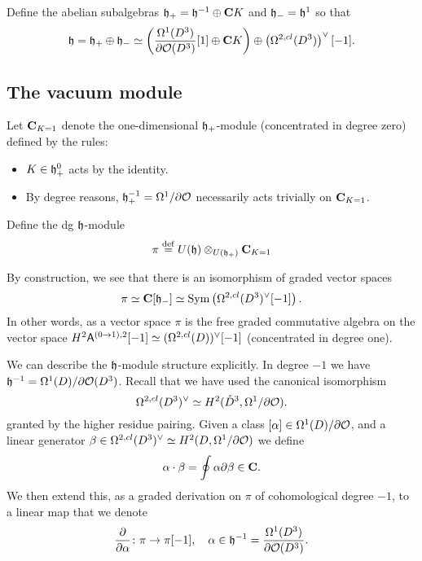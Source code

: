 \documentclass[11pt]{amsart}
\renewcommand{\op}{\operatorname}
\begin{document}
Define the abelian subalgebras $\mathfrak{h}_{+} = \mathfrak{h}^{-1} \oplus \mathbf{C} K$ and $\mathfrak{h}_{-} = \mathfrak{h}^{1}$ so that
\begin{equation}\label{}
  \mathfrak{h} = \mathfrak{h}_{+} \oplus \mathfrak{h}_{-} \simeq \left(\frac{\Omega^{1}(D^{3})}{\partial \mathcal O(D^{3})} [1] \oplus \mathbf{C} K\right) \oplus \left(\Omega^{2,cl}(D^{3})\right)^{\vee} [-1] .
\end{equation}


\subsection{The vacuum module}

Let $\mathbf{C}_{K=1}$ denote the one-dimensional $\mathfrak{h}_{+}$-module (concentrated in degree zero) defined by the rules:
\begin{itemize}
  \item $K \in \mathfrak{h}_{+}^{0}$ acts by the identity.
  \item By degree reasons, $\mathfrak{h}_{+}^{-1} = \Omega^{1} \slash \partial \mathcal O$ necessarily acts trivially on $\mathbf{C}_{K = 1}$.
\end{itemize}

Define the dg $\mathfrak{h}$-module
\begin{equation}\label{eqn:module}
  \pi \overset{\rm def}{=} U(\mathfrak{h}) \otimes_{U(\mathfrak{h}_{+})} \mathbf{C}_{K=1}
\end{equation}

By construction, we see that there is an isomorphism of graded vector spaces
\begin{equation}\label{eqn:isomorphism?}
\pi \simeq \C[\lie{h}_{-}] \simeq \op{Sym} \left( \Omega^{2,cl}(D^{3})^{\vee}[-1] \right) .
\end{equation}
In other words, as a vector space $\pi$ is the free graded commutative algebra on the vector space $H^{2}\mathsf A^{(0 \to 1),2}[-1] \simeq (\Omega^{2,cl}(D))^{\vee}[-1]$ (concentrated in degree one).

We can describe the $\mathfrak{h}$-module structure explicitly.
In degree $-1$ we have $\mathfrak{h}^{-1} = \Omega^{1}(D)\slash \partial \mathcal O(D^{3})$.
Recall that we have used the canonical isomorphism
\begin{equation}\label{eqn:serre}
\Omega^{2,cl}(D^{3})^{\vee} \simeq H^{2}(\mathring{D}^{3}, \Omega^{1} \slash \partial \mathcal O) .
\end{equation}
granted by the higher residue pairing.
Given a class $[\alpha] \in \Omega^{1}(D)\slash \partial \mathcal O$, and a linear generator $\beta \in \Omega^{2,cl}(D^{3})^{\vee} \simeq H^{2}(D, \Omega^{1} \slash \partial \mathcal O)$ we define
\begin{equation}\label{eqn:alphaaction}
\alpha \cdot \beta = \oint \alpha \partial \beta \in \mathbf{C} .
\end{equation}
We then extend this, as a graded derivation on $\pi$ of cohomological degree $-1$, to a linear map that we denote
\begin{equation}\label{eqn:derivation}
  \frac{\partial}{\partial \alpha} \colon \pi \to \pi [-1], \quad \alpha \in \mathfrak{h}^{-1} = \frac{\Omega^{1}(D^{3})}{\partial \mathcal O(D^{3})} .
\end{equation}
\end{document}
